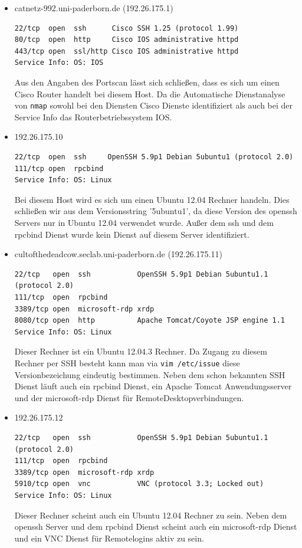 \documentclass[10pt,a4paper]{article}
\begin{document}
\begin{itemize}
\item catnetz-992.uni-paderborn.de (192.26.175.1)
\begin{verbatim}
22/tcp  open  ssh      Cisco SSH 1.25 (protocol 1.99)
80/tcp  open  http     Cisco IOS administrative httpd
443/tcp open  ssl/http Cisco IOS administrative httpd
Service Info: OS: IOS
\end{verbatim}
Aus den Angaben des Portscan lässt sich schließen, dass es sich um einen Cisco Router handelt bei diesem Host. Da die Automatische Dienstanalyse von \texttt{nmap} sowohl bei den Diensten Cisco Dienste identifiziert als auch bei der Service Info das Routerbetriebssystem IOS. 
\item 192.26.175.10
\begin{verbatim}
22/tcp  open  ssh     OpenSSH 5.9p1 Debian 5ubuntu1 (protocol 2.0)
111/tcp open  rpcbind
Service Info: OS: Linux
\end{verbatim}
Bei diesem Host wird es sich um einen Ubuntu 12.04 Rechner handeln. Dies schließen wir aus dem Versionsstring '5ubuntu1', da diese Version des openssh Servers nur in Ubuntu 12.04 verwendet wurde. Außer dem ssh und dem rpcbind Dienst wurde kein Dienst auf diesem Server identifiziert.
\item cultofthedeadcow.seclab.uni-paderborn.de (192.26.175.11)
\begin{verbatim}
22/tcp   open  ssh           OpenSSH 5.9p1 Debian 5ubuntu1.1 (protocol 2.0)
111/tcp  open  rpcbind
3389/tcp open  microsoft-rdp xrdp
8080/tcp open  http          Apache Tomcat/Coyote JSP engine 1.1
Service Info: OS: Linux
\end{verbatim}
Dieser Rechner ist ein Ubuntu 12.04.3 Rechner. Da Zugang zu diesem Rechner per SSH besteht kann man via \texttt{vim /etc/issue} diese Versionbezeichung eindeutig bestimmen. Neben dem schon bekannten SSH Dienst läuft auch ein rpcbind Dienst, ein Apache Tomcat Anwendungsserver und der microsoft-rdp Dienst für RemoteDesktopverbindungen.
\item 192.26.175.12
\begin{verbatim}
22/tcp   open  ssh           OpenSSH 5.9p1 Debian 5ubuntu1.1 (protocol 2.0)
111/tcp  open  rpcbind
3389/tcp open  microsoft-rdp xrdp
5910/tcp open  vnc           VNC (protocol 3.3; Locked out)
Service Info: OS: Linux
\end{verbatim}
Dieser Rechner scheint auch ein Ubuntu 12.04 Rechner zu sein. Neben dem openssh Server und dem rpcbind Dienst scheint auch ein microsoft-rdp Dienst und ein VNC Dienst für Remotelogins aktiv zu sein.

\end{itemize}
\end{document}
